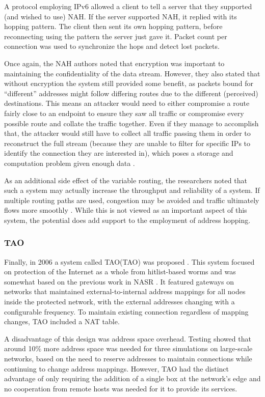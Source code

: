 \par A protocol employing \ac{IPv6} allowed a client to tell a server that they supported (and wished to use) NAH. If the server supported NAH, it replied with its hopping pattern. The client then sent its own hopping pattern, before reconnecting using the pattern the server just gave it. Packet count per connection was used to synchronize the hops and detect lost packets.

\par Once again, the NAH authors noted that encryption was important to maintaining the confidentiality of the data stream. However, they also stated that without encryption the system still provided some benefit, as packets bound for ``different'' addresses might follow differing routes due to the different (perceived) destinations. This means an attacker would need to either compromise a route fairly close to an endpoint to ensure they saw all traffic or compromise every possible route and collate the traffic together. Even if they manage to accomplish that, the attacker would still have to collect all traffic passing them in order to reconstruct the full stream (because they are unable to filter for specific IPs to identify the connection they are interested in), which poses a storage and computation problem given enough data \cite{NAH}.

\par As an additional side effect of the variable routing, the researchers noted that such a system may actually increase the throughput and reliability of a system. If multiple routing paths are used, congestion may be avoided and traffic ultimately flows more smoothly \cite{MultimediaDistributed}. While this is not viewed as an important aspect of this system, the potential does add support to the employment of address hopping.

\subsubsection{\acf{TAO}}
\par Finally, in 2006 a system called \ac{TAO}(TAO) was proposed \cite{TAO}. This system focused on protection of the Internet as a whole from hitlist-based worms and was somewhat based on the previous work in \ac{NASR} \cite{NASR}. It featured gateways on networks that maintained external-to-internal address mappings for all nodes inside the protected network, with the external addresses changing with a configurable frequency. To maintain existing connection regardless of mapping changes, TAO included a \ac{NAT} table. 

\par A disadvantage of this design was address space overhead. Testing showed that around 10\% more address space was needed for three simulations on large-scale networks, based on the need to reserve addresses to maintain connections while continuing to change address mappings. However, TAO had the distinct advantage of only requiring the addition of a single box at the network's edge and no cooperation from remote hosts was needed for it to provide its services.


